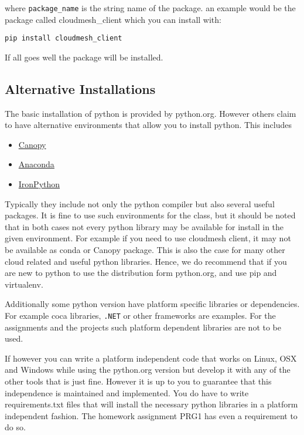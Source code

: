 where \verb|package_name| is the string name of the package. an example would
be the package called cloudmesh\_client which you can install with:

\begin{verbatim}
pip install cloudmesh_client
\end{verbatim}

If all goes well the package will be installed.

\subsection{Alternative Installations}\label{alternative-installations}

The basic installation of python is provided by python.org. However
others claim to have alternative environments that allow you to install
python. This includes

\begin{itemize}

\item
  \href{https://store.enthought.com/downloads/\#default}{Canopy}
\item
  \href{https://www.continuum.io/downloads}{Anaconda}
\item
  \href{http://ironpython.net/}{IronPython}
\end{itemize}

Typically they include not only the python compiler but also several
useful packages. It is fine to use such environments for the class, but
it should be noted that in both cases not every python library may be
available for install in the given environment. For example if you need
to use cloudmesh client, it may not be available as conda or Canopy
package. This is also the case for many other cloud related and useful
python libraries. Hence, we do recommend that if you are new to python
to use the distribution form python.org, and use pip and virtualenv.

Additionally some python version have platform specific libraries or
dependencies. For example coca libraries, \verb|.NET| or other frameworks are
examples. For the assignments and the projects such platform dependent
libraries are not to be used.

If however you can write a platform independent code that works on
Linux, OSX and Windows while using the python.org version but develop it
with any of the other tools that is just fine. However it is up to you
to guarantee that this independence is maintained and implemented. You
do have to write requirements.txt files that will install the necessary
python libraries in a platform independent fashion. The homework
assignment PRG1 has even a requirement to do so.

